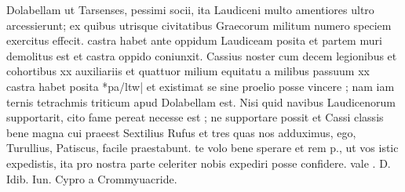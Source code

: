  Dolabellam ut Tarsenses, pessimi socii, ita Laudiceni multo amentiores ultro arcessierunt; ex quibus utrisque civitatibus Graecorum militum numero speciem exercitus effecit. castra habet ante oppidum Laudiceam posita et partem muri demolitus est et castra oppido coniunxit. Cassius noster cum decem legionibus et cohortibus xx auxiliariis et quattuor milium equitatu a milibus passuum xx castra habet posita *pa/ltw| et existimat se sine proelio posse vincere ; nam iam ternis tetrachmis triticum apud Dolabellam est. Nisi quid navibus Laudicenorum supportarit, cito fame pereat necesse est ; ne supportare possit et Cassi classis bene magna cui praeest Sextilius Rufus et tres quas nos adduximus, ego, Turullius, Patiscus, facile praestabunt. te volo bene sperare et rem p., ut vos istic expedistis, ita pro nostra parte celeriter nobis expediri posse confidere. vale . D. Idib. Iun. Cypro a Crommyuacride.
